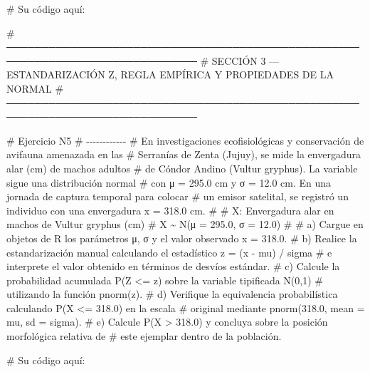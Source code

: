 \documentclass[
  spanish,
  letterpaper,
  DIV=11,
  numbers=noendperiod]{scrreprt}
\newenvironment{Shaded}{\begin{snugshade}}{\end{snugshade}}
\newcommand{\CommentTok}[1]{\textcolor[rgb]{0.37,0.37,0.37}{#1}}
\begin{document}
\begin{Shaded}
\begin{Highlighting}[]
\CommentTok{\# Su código aquí:}


\CommentTok{\# ─────────────────────────────────────────────────────────────────────────────}
\CommentTok{\#  SECCIÓN 3 — ESTANDARIZACIÓN Z, REGLA EMPÍRICA Y PROPIEDADES DE LA NORMAL}
\CommentTok{\# ─────────────────────────────────────────────────────────────────────────────}

\CommentTok{\# Ejercicio N5}
\CommentTok{\# {-}{-}{-}{-}{-}{-}{-}{-}{-}{-}{-}{-}}
\CommentTok{\# En investigaciones ecofisiológicas y conservación de avifauna amenazada en las}
\CommentTok{\# Serranías de Zenta (Jujuy), se mide la envergadura alar (cm) de machos adultos}
\CommentTok{\# de Cóndor Andino (Vultur gryphus). La variable sigue una distribución normal}
\CommentTok{\# con μ = 295.0 cm y σ = 12.0 cm. En una jornada de captura temporal para colocar}
\CommentTok{\# un emisor satelital, se registró un individuo con una envergadura x = 318.0 cm.}
\CommentTok{\#}
\CommentTok{\#  X: Envergadura alar en machos de Vultur gryphus (cm)}
\CommentTok{\#  X \textasciitilde{} N(μ = 295.0, σ = 12.0)}
\CommentTok{\#}
\CommentTok{\# a) Cargue en objetos de R los parámetros μ, σ y el valor observado x = 318.0.}
\CommentTok{\# b) Realice la estandarización manual calculando el estadístico z = (x {-} mu) / sigma}
\CommentTok{\#    e interprete el valor obtenido en términos de desvíos estándar.}
\CommentTok{\# c) Calcule la probabilidad acumulada P(Z \textless{}= z) sobre la variable tipificada N(0,1)}
\CommentTok{\#    utilizando la función pnorm(z).}
\CommentTok{\# d) Verifique la equivalencia probabilística calculando P(X \textless{}= 318.0) en la escala}
\CommentTok{\#    original mediante pnorm(318.0, mean = mu, sd = sigma).}
\CommentTok{\# e) Calcule P(X \textgreater{} 318.0) y concluya sobre la posición morfológica relativa de}
\CommentTok{\#    este ejemplar dentro de la población.}

\CommentTok{\# Su código aquí:}



\end{Highlighting}
\end{Shaded}
\end{document}
